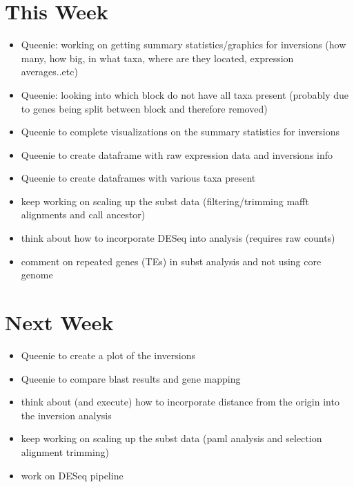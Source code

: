 \documentclass[12pt]{article}
\begin{document}

\section*{This Week}
%
\begin{itemize}
	\item Queenie: working on getting summary statistics/graphics for inversions (how many, how big, in what taxa, where are they located, expression averages..etc)	
	\item Queenie: looking into which block do not have all taxa present (probably due to genes being split between block and therefore removed)
	\item Queenie to complete visualizations on the summary statistics for inversions
	\item Queenie to create dataframe with raw expression data and inversions info
	\item Queenie to create dataframes with various taxa present
	
	\item keep working on scaling up the subst data (filtering/trimming mafft alignments and call ancestor)
	\item think about how to incorporate DESeq into analysis (requires raw counts)
	\item comment on repeated genes (TEs) in subst analysis and not using core genome
	
\end{itemize}


\section*{Next Week}
\begin{itemize}
	\item Queenie to create a plot of the inversions
	\item Queenie to compare blast results and gene mapping
	\item think about (and execute) how to incorporate distance from the origin into the inversion analysis
	\item keep working on scaling up the subst data (paml analysis and selection alignment trimming)
	\item work on DESeq pipeline
\end{itemize}
\end{document}
